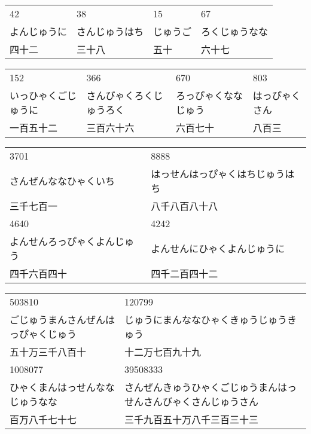 
\author{Katja Kržišnik}

	
	
	
    	\begin{tabular}{l l l l}
	    	42	&	38	&	15	&	67	\\
	    	よんじゅうに	&	さんじゅうはち	&	じゅうご	&	ろくじゅうなな	\\
	    	四十二	&	三十八   &	  五十   &	六十七	\\
     	\end{tabular}
    
    
         \begin{tabular}{l l l l}
        	 152	&	366	&	670		&	803	\\
        	いっひゃくごじゅうに	&	さんびゃくろくじゅうろく	&	ろっぴゃくななじゅう	&	はっぴゃくさん	\\
         	一百五十二	&	三百六十六   &	六百七十   &	八百三	\\
        \end{tabular}

    
        \begin{tabular}{l l}
        	3701	&	8888	 \\
        	さんぜんななひゃくいち &	はっせんはっぴゃくはちじゅうはち	\\
        	三千七百一	&	八千八百八十八   \\
        	4640    &      4242\\
        	よんせんろっぴゃくよんじゅう			&	よんせんにひゃくよんじゅうに	\\
        	四千六百四十   &	四千二百四十二	\\
        \end{tabular}

    
        \begin{tabular}{l l }
        	503810	&	120799	\\
        	ごじゅうまんさんぜんはっぴゃくじゅう	&	じゅうにまんななひゃくきゅうじゅうきゅう	\\
        	五十万三千八百十	&	十二万七百九十九   \\
        	1008077			&	39508333	\\
        	ひゃくまんはっせんななじゅうなな			&	さんぜんきゅうひゃくごじゅうまんはっせんさんびゃくさんじゅうさん	\\
        	百万八千七十七   &	三千九百五十万八千三百三十三	\\
        \end{tabular}
    
